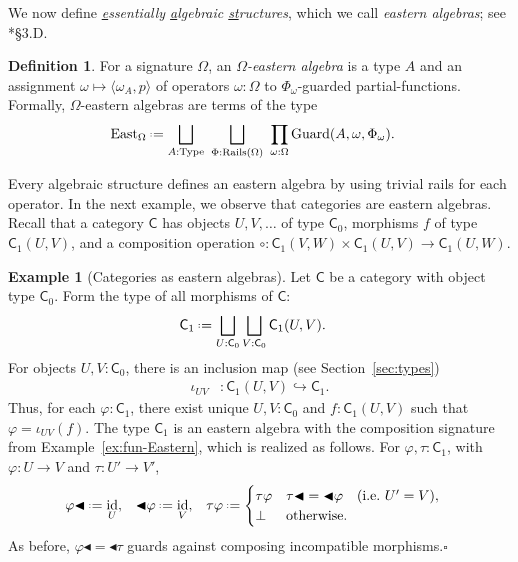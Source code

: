 \documentclass{amsart}
\newcommand{\tin}{:}
\newcommand{\Cat}[1]{\mathsf{#1}}
\newcommand{\cat}[1]{\Cat{#1}}
\newcommand{\acat}[1]{\mathsf{#1}}
\numberwithin{lstfloat}{section}
\DeclareMathOperator{\id}{id}
\newcommand{\srcfunc}{\mathbin{\blacktriangleleft}}
\newcommand{\tgtfunc}{\mathbin{\blacktriangleleft}}
\newcommand{\src}[1]{#1\srcfunc}
\newcommand{\tgt}[1]{\tgtfunc #1}
\newcommand{\type}[1]{#1}
\newcommand{\defeq}{\mathrel{\hstretch{.13}{=}\hspace{.2ex}{=}}}
\newcommand{\exqed}{\hfill $\square$}
\newcommand{\pf}{p}
\theoremstyle{definition}
\newtheorem{defn}[thm]{Definition}
\newtheorem{ex}[thm]{Example}
\theoremstyle{remark}
\numberwithin{equation}{section}
\begin{document}
We now define \emph{\underline{e}ssentially \underline{a}lgebraic
\underline{st}ructures}, which we call \emph{eastern algebras}; see
\cite{AR1994:categories}*{\S 3.D}.

\begin{defn}\label{def:Eastalg}
  For a signature $\Omega$, an \emph{$\Omega$-eastern algebra}
  is a type $\type{A}$ and 
  an assignment $\omega\mapsto \langle\omega_{\type{A}}, \pf\rangle$ of operators $\omega:\Omega$ to $\Phi_{\omega}$-guarded partial-functions.
  Formally, $\Omega$-eastern algebras are terms of the type 
  \begin{align*}
    \mathrm{East}_{\Omega} & \defeq 
        \bigsqcup_{\type{A}:\mathrm{Type}}~\bigsqcup_{\Phi\tin \mathrm{Rails}(\Omega)} ~\prod_{\omega:\Omega} \mathrm{Guard}(\type{A},\omega,\Phi_{\omega}).
  \end{align*} 
\end{defn}
Every algebraic structure defines an eastern algebra by using trivial rails for each operator.
In the next example, we observe that categories are eastern algebras.
Recall that a category $\cat{C}$ has objects $U,V,\ldots $ of type
$\cat{C}_0$, morphisms $f$ of type $\cat{C}_1(U,V)$, 
and a composition operation
$\circ:\cat{C}_1(V,W)\times \cat{C}_1(U,V)\to \cat{C}_1(U,W)$. 

\begin{ex}[Categories as eastern algebras]
\label{ex:cats-Eastern}
  Let $\cat{C}$ be a category with object type $\cat{C}_0$.
  Form the type of all morphisms of $\cat{C}$:
  \begin{align}\label{eqn:all-morphisms}
      \cat{C}_1 &\defeq \bigsqcup_{U:\cat{C}_0}\bigsqcup_{V:\cat{C}_0} \cat{C}_1(U,V).
  \end{align} 
  For objects $U,V:\cat{C}_0$, there is an
  inclusion map (see Section~\ref{sec:types})
  \begin{align*} 
     \iota_{UV} & : \cat{C}_1(U,V)\hookrightarrow \acat{C}_1.
  \end{align*} 
  Thus, for each $\varphi:\acat{C}_1$, there exist unique $U,V:\cat{C}_0$ 
  and $f:\cat{C}_1(U,V)$ such that  $\varphi=\iota_{UV}(f)$.
  The type $\acat{C}_1$ is an eastern algebra with the
  composition signature from Example~\ref{ex:fun-Eastern}, which is realized as follows. For $\varphi,\tau:\acat{C}_1$, with 
  $\varphi : U\to V$ and $\tau:U'\to V'$,
  \begin{align*}
    \src{\varphi} & \defeq \id_{U},
    &
    \tgt{\varphi} & \defeq \id_{V},
    &
    \tau\varphi & \defeq \begin{cases} 
        \tau \varphi & \src{\tau} = \tgt{\varphi}\quad (\textrm{i.e.}~U'=V), \\
        \bot & \text{otherwise}.
    \end{cases}
  \end{align*} 
  As before,  $\src{\varphi} = \tgt{\tau}$ guards against composing
  incompatible morphisms.\exqed
\end{ex}
\end{document}
